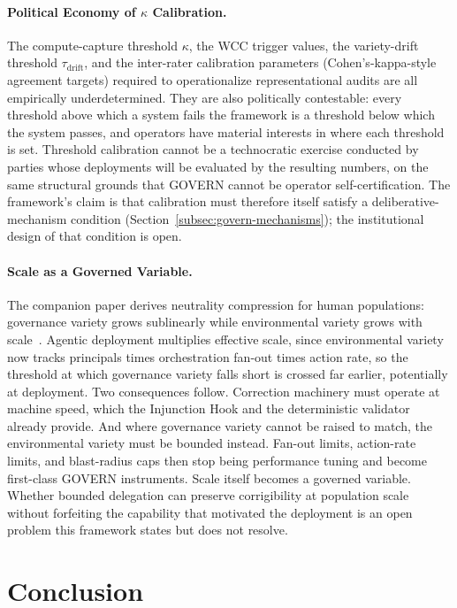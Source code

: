 \documentclass{article}
\theoremstyle{definition}
\begin{document}
\paragraph{Political Economy of $\kappa$ Calibration.} The compute-capture threshold $\kappa$, the WCC trigger values, the variety-drift threshold $\tau_{\text{drift}}$, and the inter-rater calibration parameters (Cohen's-kappa-style agreement targets) required to operationalize representational audits are all empirically underdetermined. They are also politically contestable: every threshold above which a system fails the framework is a threshold below which the system passes, and operators have material interests in where each threshold is set. Threshold calibration cannot be a technocratic exercise conducted by parties whose deployments will be evaluated by the resulting numbers, on the same structural grounds that GOVERN cannot be operator self-certification. The framework's claim is that calibration must therefore itself satisfy a deliberative-mechanism condition (Section~\ref{subsec:govern-mechanisms}); the institutional design of that condition is open.

\paragraph{Scale as a Governed Variable.} The companion paper derives neutrality compression for human populations: governance variety grows sublinearly while environmental variety grows with scale~\citep{aravind2026dpi}. Agentic deployment multiplies effective scale, since environmental variety now tracks principals times orchestration fan-out times action rate, so the threshold at which governance variety falls short is crossed far earlier, potentially at deployment. Two consequences follow. Correction machinery must operate at machine speed, which the Injunction Hook and the deterministic validator already provide. And where governance variety cannot be raised to match, the environmental variety must be bounded instead. Fan-out limits, action-rate limits, and blast-radius caps then stop being performance tuning and become first-class GOVERN instruments. Scale itself becomes a governed variable. Whether bounded delegation can preserve corrigibility at population scale without forfeiting the capability that motivated the deployment is an open problem this framework states but does not resolve.

\section{Conclusion}
\end{document}
